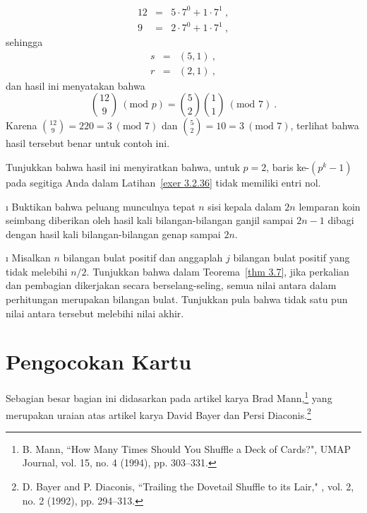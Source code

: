 \begin{LJSItem}
\begin{eqnarray*} 12 & = & 5 \cdot 7^0 + 1 \cdot 7^1\ , \\
 9 & = & 2 \cdot 7^0 + 1 \cdot 7^1\ , 
\end{eqnarray*} sehingga
\begin{eqnarray*} s & = & (5, 1)\ , \\ r & = & (2, 1)\ , 
\end{eqnarray*} dan hasil ini menyatakan bahwa
$$ {12 \choose 9}~(\mbox{mod\ }p) = {5 \choose 2}  {1 \choose 1}~(\mbox{mod\ }7)\ .
$$ Karena ${12 \choose 9} = 220 = 3~(\mbox{mod\ }7)$ dan ${5 \choose 2} = 10 = 3~
(\mbox{mod\ }7)$, terlihat bahwa hasil tersebut benar untuk contoh ini.

Tunjukkan bahwa hasil ini menyiratkan bahwa, untuk $p = 2$, baris ke-$(p^k - 1)$ pada
segitiga Anda dalam Latihan~\ref{exer 3.2.36} tidak memiliki entri nol.

\i\label{exer 3.2.38} Buktikan bahwa peluang munculnya tepat $n$ sisi kepala dalam
$2n$ lemparan koin seimbang diberikan oleh hasil kali bilangan-bilangan ganjil sampai
$2n - 1$ dibagi dengan hasil kali bilangan-bilangan genap sampai $2n$.

\i\label{exer 3.2.39} Misalkan $n$ bilangan bulat positif dan anggaplah $j$ bilangan
bulat positif yang tidak melebihi $n/2$.  Tunjukkan bahwa dalam Teorema~\ref{thm 3.7},
jika perkalian dan pembagian dikerjakan secara berselang-seling, semua nilai antara
dalam perhitungan merupakan bilangan bulat.  Tunjukkan pula bahwa tidak satu pun nilai
antara tersebut melebihi nilai akhir.

\end{LJSItem}

\section{Pengocokan Kartu}\label{sec 3.3} 

Sebagian besar bagian ini didasarkan pada artikel karya Brad Mann,\footnote{B. Mann, ``How Many
Times Should You Shuffle a Deck of Cards?", \emx 
{UMAP Journal}, vol. 15, no. 4 (1994), pp. 303--331.}
yang merupakan uraian atas artikel karya David Bayer dan Persi Diaconis.\footnote{D. Bayer and
P. Diaconis, ``Trailing the Dovetail Shuffle to its Lair," ,
vol. 2, no. 2 (1992), pp. 294--313.}
